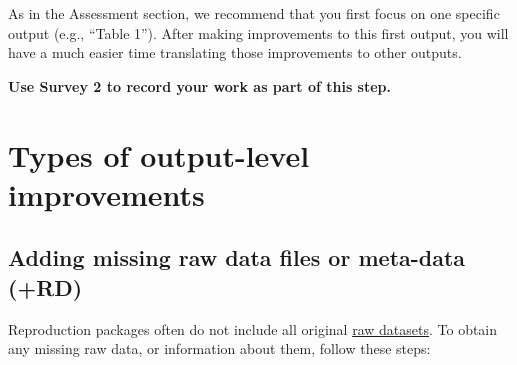 \documentclass[]{book}
\begin{document}
As in the Assessment section, we recommend that you first focus on one specific output (e.g., ``Table 1''). After making improvements to this first output, you will have a much easier time translating those improvements to other outputs.

\textbf{Use Survey 2 to record your work as part of this step.}

\hypertarget{types-of-output-level-improvements}{%
\section{Types of output-level improvements}\label{types-of-output-level-improvements}}

\hypertarget{rd}{%
\subsection{Adding missing raw data files or meta-data (+RD)}\label{rd}}

Reproduction packages often do not include all original \protect\hyperlink{describe-inputs}{raw datasets}. To obtain any missing raw data, or information about them, follow these steps:
\end{document}
